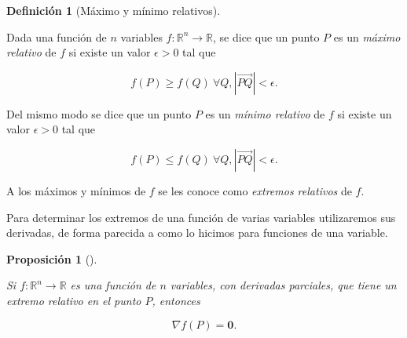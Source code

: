 \documentclass[
  a4paper,
]{scrreport}
\theoremstyle{definition}
\newtheorem{definition}{Definición}[chapter]
\theoremstyle{plain}
\theoremstyle{plain}
\newtheorem{proposition}{Proposición}[chapter]
\theoremstyle{definition}
\theoremstyle{definition}
\theoremstyle{plain}
\theoremstyle{remark}
\begin{document}
\begin{definition}[Máximo y mínimo
relativos]\protect\hypertarget{def-extremos-relativos}{}\label{def-extremos-relativos}

Dada una función de \(n\) variables \(f:\mathbb{R}^n\to \mathbb{R}\), se
dice que un punto \(P\) es un \emph{máximo relativo} de \(f\) si existe
un valor \(\epsilon>0\) tal que

\[
f(P)\geq f(Q)\ \forall Q, |\vec{PQ}|<\epsilon.
\]

Del mismo modo se dice que un punto \(P\) es un \emph{mínimo relativo}
de \(f\) si existe un valor \(\epsilon>0\) tal que

\[
f(P)\leq f(Q)\ \forall Q, |\vec{PQ}|<\epsilon.
\]

A los máximos y mínimos de \(f\) se les conoce como \emph{extremos
relativos} de \(f\).

\end{definition}

Para determinar los extremos de una función de varias variables
utilizaremos sus derivadas, de forma parecida a como lo hicimos para
funciones de una variable.

\begin{proposition}[]\protect\hypertarget{prp-anulacion-gradiente-extremo}{}\label{prp-anulacion-gradiente-extremo}

Si \(f:\mathbb{R}^n\to \mathbb{R}\) es una función de \(n\) variables,
con derivadas parciales, que tiene un extremo relativo en el punto
\(P\), entonces

\[
\nabla f(P) = \mathbf{0}.
\]

\end{proposition}
\end{document}
